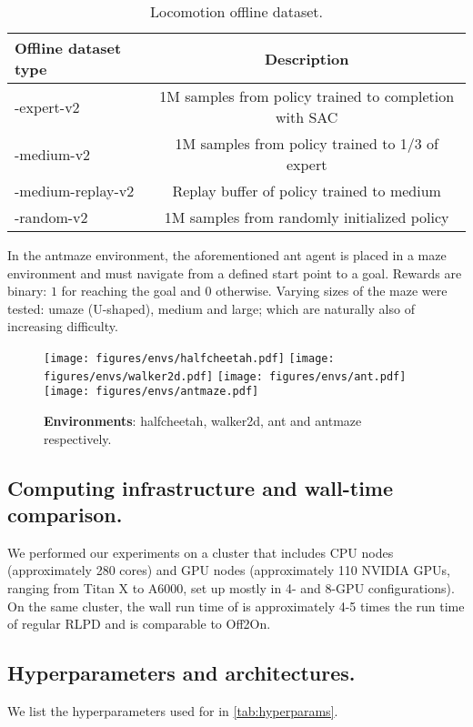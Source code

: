 \begin{table}[H]
    \centering
    \begin{tabular}{l|c}
    \hline
        {\bf Offline dataset type} & {\bf Description} \\
        \hline
        -expert-v2 & 1M samples from policy trained to completion with SAC\\
        -medium-v2 & 1M samples from policy trained to 1/3 of expert\\
        -medium-replay-v2 & Replay buffer of policy trained to medium\\
        -random-v2 & 1M samples from randomly initialized policy \\
        \hline
    \end{tabular}
    \caption{Locomotion offline dataset.}
    \label{tab:env_description}
\end{table}
In the antmaze environment, the aforementioned ant agent is placed in a maze environment and must navigate from a defined start point to a goal. Rewards are binary: $1$ for reaching the goal and $0$ otherwise. Varying sizes of the maze were tested: umaze (U-shaped), medium and large; which are naturally also of increasing difficulty.


\begin{figure}[ht]
    \centering
    \texttt{[image: figures/envs/halfcheetah.pdf]} \hfil
    \texttt{[image: figures/envs/walker2d.pdf]}\hfil
    \texttt{[image: figures/envs/ant.pdf]}\hfil
    \texttt{[image: figures/envs/antmaze.pdf]}\hfil
    \caption{
    \textbf{Environments}: halfcheetah, walker2d, ant and antmaze respectively. 
}\label{fig:exp:env}


\end{figure}

\subsection{Computing infrastructure and wall-time comparison.}
We performed our experiments on a cluster that includes CPU nodes (approximately 280 cores) and GPU nodes (approximately 110 NVIDIA GPUs, ranging from Titan X to A6000, set up mostly in 4- and 8-GPU configurations). On the same cluster, the wall run time of \algname is approximately 4-5 times the run time of regular RLPD and is comparable to Off2On.

\subsection{Hyperparameters and architectures.}
We list the hyperparameters used for \algname in \autoref{tab:hyperparams}.


